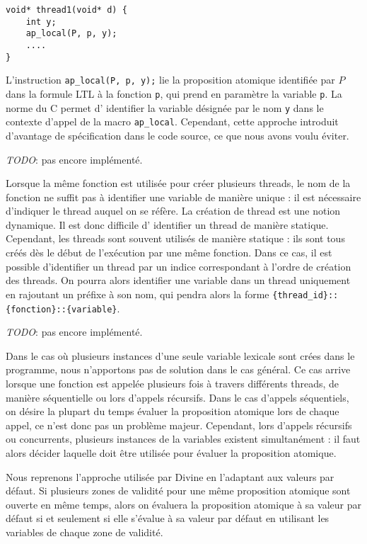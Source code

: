 \begin{lstlisting}
void* thread1(void* d) {
    int y;
    ap_local(P, p, y);
    ....
}
\end{lstlisting}

L'instruction \lstinline!ap_local(P, p, y);! lie la proposition atomique
identifiée par \(P\) dans la formule LTL à la fonction \lstinline!p!, qui prend
en paramètre la variable \lstinline!p!. La norme du C permet d' identifier la
variable désignée par le nom \lstinline!y! dans le contexte d'appel de la macro
\lstinline!ap_local!. Cependant, cette approche introduit d'avantage de
spécification dans le code source, ce que nous avons voulu éviter.

\emph{TODO}: pas encore implémenté.

Lorsque la même fonction est utilisée pour créer plusieurs threads, le
nom de la fonction ne suffit pas à identifier une variable de manière
unique : il est nécessaire d'indiquer le thread auquel on se réfère. La
création de thread est une notion dynamique. Il est donc difficile d'
identifier un thread de manière statique. Cependant, les threads sont
souvent utilisés de manière statique : ils sont tous créés dès le début
de l'exécution par une même fonction. Dans ce cas, il est possible
d'identifier un thread par un indice correspondant à l'ordre de création
des threads. On pourra alors identifier une variable dans un thread
uniquement en rajoutant un préfixe à son nom, qui pendra alors la forme
\lstinline!{thread_id}::{fonction}::{variable}!.

\emph{TODO}: pas encore implémenté.

Dans le cas où plusieurs instances d'une seule variable lexicale sont
crées dans le programme, nous n'apportons pas de solution dans le cas
général. Ce cas arrive lorsque une fonction est appelée plusieurs fois à
travers différents threads, de manière séquentielle ou lors d'appels
récursifs. Dans le cas d'appels séquentiels, on désire la plupart du
temps évaluer la proposition atomique lors de chaque appel, ce n'est
donc pas un problème majeur. Cependant, lors d'appels récursifs ou
concurrents, plusieurs instances de la variables existent simultanément
: il faut alors décider laquelle doit être utilisée pour évaluer la
proposition atomique.

Nous reprenons l'approche utilisée par Divine \cite{Divine_LTL} en
l'adaptant aux valeurs par défaut. Si plusieurs zones de validité pour
une même proposition atomique sont ouverte en même temps, alors on
évaluera la proposition atomique à sa valeur par défaut si et seulement
si elle s'évalue à sa valeur par défaut en utilisant les variables de
chaque zone de validité.

